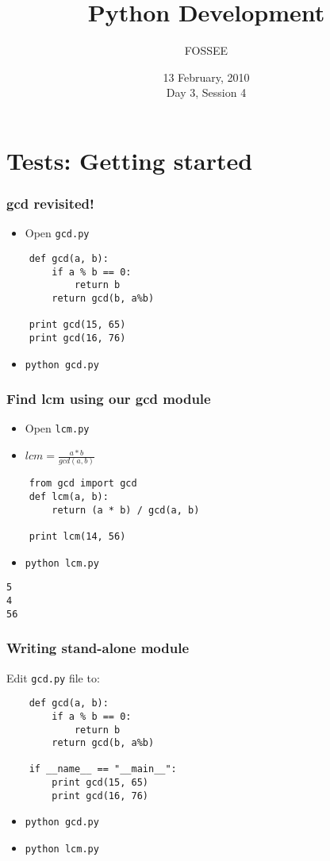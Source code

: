 \documentclass[compress,14pt]{beamer}
\title[Python Development]{Python Development}
\author[FOSSEE] {FOSSEE}
\institute[IIT Bombay] {Department of Aerospace Engineering\\IIT Bombay}
\date[] {13 February, 2010\\Day 3, Session 4}
\begin{document}
\begin{frame}
  \maketitle
\end{frame}

\section{Tests: Getting started}
\begin{frame}[fragile] 
  \frametitle{gcd revisited!}
  \begin{itemize}
  \item Open \texttt{gcd.py}
  \end{itemize}  
\begin{lstlisting}
    def gcd(a, b):
        if a % b == 0: 
            return b
        return gcd(b, a%b)

    print gcd(15, 65)
    print gcd(16, 76)
\end{lstlisting}
  \begin{itemize}
  \item \texttt{python gcd.py}
  \end{itemize}
\end{frame}

\begin{frame}[fragile] 
  \frametitle{Find lcm using our gcd module}
  \begin{itemize}
  \item Open \texttt{lcm.py}  
  \item $lcm = \frac{a * b}{gcd(a,b)}$
  \end{itemize}  
\begin{lstlisting}
    from gcd import gcd    
    def lcm(a, b):
        return (a * b) / gcd(a, b)
    
    print lcm(14, 56)
\end{lstlisting}
  \begin{itemize}
  \item \texttt{python lcm.py}
  \end{itemize}
  \begin{lstlisting}
5
4
56
  \end{lstlisting}    
\end{frame}

\begin{frame}[fragile] 
  \frametitle{Writing stand-alone module}  
Edit \texttt{gcd.py} file to:
\begin{lstlisting}
    def gcd(a, b):
        if a % b == 0: 
            return b
        return gcd(b, a%b)

    if __name__ == "__main__":        
        print gcd(15, 65)
        print gcd(16, 76)
\end{lstlisting}
  \begin{itemize}
  \item \texttt{python gcd.py}
  \item \texttt{python lcm.py}
  \end{itemize}
\end{frame}
\end{document}
